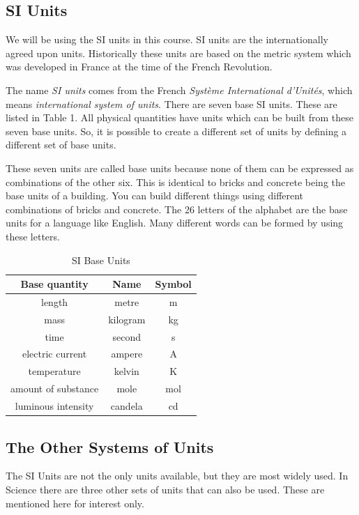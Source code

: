             \subsection*{SI Units}
            \nopagebreak
        \label{m30853*id62587}We will be using the SI units in this course. SI units are the
internationally agreed upon units. Historically these units are
based on the metric system which was developed in France at the
time of the French Revolution.\par 
  { The name \textsl{SI units} comes from the
French \textsl{Syst\`{e}me International d'Unit\'{e}s}, which means
\textsl{international system of units}.  } 
        \label{m30853*id62624}There are seven base SI units. These are listed in
Table 1. All physical quantities have units
which can be built from these seven base units. So, it is possible to create a
different set of units by defining a different set of base units.\par 
        \label{m30853*id62634}These seven units are called base units because none of them can
be expressed as combinations of the other six. This is identical
to bricks and concrete being the base units of a building. You can
build different things using different combinations of bricks and
concrete. The 26 letters of the alphabet are the base units for a
language like English. Many different words can be formed by using
these letters.\par 
\begin{table}
\centering
\begin{tabular}{|c|c|c|}\hline
\textbf{Base quantity} & \textbf{Name} & \textbf{Symbol} \\
\hline length & metre & m\\ \hline mass & kilogram & kg\\
\hline time & second & s\\ \hline electric current & ampere& A\\
\hline temperature & kelvin & K\\ \hline amount of substance &
mole & mol\\ \hline luminous intensity & candela & cd\\ \hline
\end{tabular}
\caption{SI Base Units}\label{tab:units:SIunits}
\end{table}
    \par
      \label{m30853*uid3}
            \subsection*{The Other Systems of Units}
            \nopagebreak
        \label{m30853*id62886}The SI Units are not the only units available, but they are most
widely used. In Science there are three other sets of units that
can also be used. These are mentioned here for interest only.\par 
        \label{m30853*uid4}
